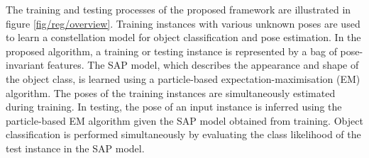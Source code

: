 The training and testing processes of the proposed framework are illustrated in figure \ref{fig/reg/overview}. 
Training instances with various unknown poses are used to learn a constellation model for object classification and pose estimation. In the proposed algorithm, a training or testing instance is represented by a bag of pose-invariant features. The SAP model, which describes the appearance and shape of the object class, is learned using a particle-based expectation-maximisation (EM) algorithm. The poses of the training instances are simultaneously estimated during training. In testing, the pose of an input instance is inferred using the particle-based EM algorithm given the SAP model obtained from training. Object classification is performed simultaneously by evaluating the class likelihood of the test instance in the SAP model.


